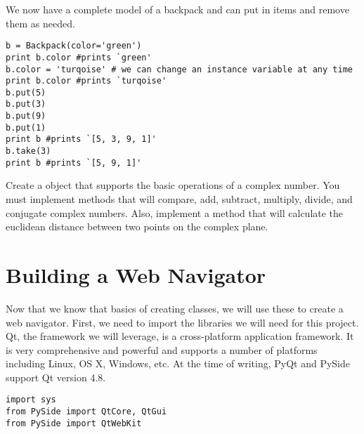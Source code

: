 We now have a complete model of a backpack and can put in items and remove them as needed.

\begin{lstlisting}
b = Backpack(color='green')
print b.color #prints `green'
b.color = 'turqoise' # we can change an instance variable at any time
print b.color #prints `turqoise'
b.put(5)
b.put(3)
b.put(9)
b.put(1)
print b #prints `[5, 3, 9, 1]'
b.take(3)
print b #prints `[5, 9, 1]'
\end{lstlisting}


\begin{problem}
Create a  object that supports the basic operations of a complex number.
You must implement methods that will compare, add, subtract, multiply, divide, and conjugate complex numbers.
Also, implement a  method that will calculate the euclidean distance between two points on the complex plane.
\label{prob:complexNum}
\end{problem}

\section*{Building a Web Navigator}
Now that we know that basics of creating classes, we will use these to create a web navigator.
First, we need to import the libraries we will need for this project.
Qt, the framework we will leverage, is a cross-platform application framework.
It is very comprehensive and powerful and supports a number of platforms including Linux, OS X, Windows, etc.
At the time of writing, PyQt and PySide support Qt version 4.8.
\begin{lstlisting}
import sys
from PySide import QtCore, QtGui
from PySide import QtWebKit
\end{lstlisting}


